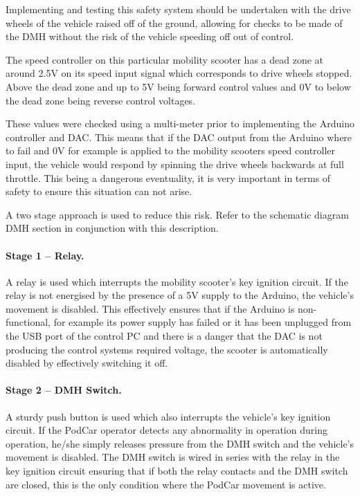 \documentclass[a4paper]{article}
\begin{document}
Implementing and testing this safety system should be undertaken with the drive wheels of the vehicle raised off of the ground, allowing for checks to be made of the DMH without the risk of the vehicle speeding off out of control.

The speed controller on this particular mobility scooter has a dead zone at around 2.5V on its speed input signal which corresponds to drive wheels stopped. Above the dead zone and up to 5V being forward control values and 0V to below the dead zone being reverse control voltages.

These values were checked using a multi-meter prior to implementing the Arduino controller and DAC.  This means that if the DAC output from the Arduino where to fail and 0V for example is applied to the mobility scooters speed controller input, the vehicle would respond by spinning the drive wheels backwards at full throttle. This being a dangerous eventuality, it is very important in terms of safety to ensure this situation can not arise.

A two stage approach is used to reduce this risk. Refer to the schematic diagram DMH section in conjunction with this description.

\paragraph{Stage 1 – Relay.} A relay is used which interrupts the mobility scooter’s key ignition circuit. If the relay is not energised by the presence of a 5V supply to the Arduino, the vehicle’s movement is disabled. This effectively ensures that if the Arduino is non-functional, for example its power supply has failed or it has been unplugged from the USB port of the control PC and there is a danger that the DAC is not producing the control systems required voltage, the scooter is automatically disabled by effectively switching it off.

\paragraph{Stage 2 – DMH Switch.} A sturdy push button is used which also interrupts the vehicle's key ignition circuit. If the PodCar operator detects any abnormality in operation during operation, he/she simply releases pressure from the DMH switch and the vehicle’s movement is disabled. The DMH switch is wired in series with the relay in the key ignition circuit ensuring that if both the relay contacts and the DMH switch are closed, this is the only condition where the PodCar movement is active.
\end{document}
